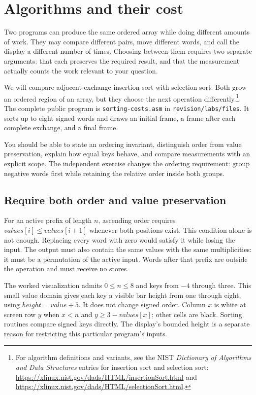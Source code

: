 \chapter{Algorithms and their cost}
\label{revision:algorithms-and-cost}

Two programs can produce the same ordered array while doing different amounts
of work. They may compare different pairs, move different words, and call the
display a different number of times. Choosing between them requires two separate
arguments: that each preserves the required result, and that the measurement
actually counts the work relevant to your question.

We will compare adjacent-exchange insertion sort with selection sort. Both grow
an ordered region of an array, but they choose the next operation differently.\footnote{For
  algorithm definitions and variants, see the NIST \emph{Dictionary of Algorithms and
    Data Structures} entries for insertion sort and selection sort:
  \url{https://xlinux.nist.gov/dads/HTML/insertionSort.html} and
  \url{https://xlinux.nist.gov/dads/HTML/selectionSort.html}.}
The complete public program is \texttt{sorting-costs.asm} in
\texttt{revision/labs/files}. It sorts up to eight signed words and draws an
initial frame, a frame after each complete exchange, and a final frame.

You should be able to state an ordering invariant, distinguish order from value
preservation, explain how equal keys behave, and compare measurements with an
explicit scope. The independent exercise changes the ordering requirement: group
negative words first while retaining the relative order inside both groups.

\section{Require both order and value preservation}

For an active prefix of length $n$, ascending order requires
$values[i]\leq values[i+1]$ whenever both positions exist. This condition alone is
not enough. Replacing every word with zero would satisfy it while losing the input.
The output must also contain the same values with the same multiplicities: it
must be a permutation of the active input. Words after that prefix are outside
the operation and must receive no stores.

The worked visualization admits $0\leq n\leq8$ and keys from $-4$ through three.
This small value domain gives each key a visible bar height from one through eight,
using $height=value+5$. It does not change signed order. Column $x$ is white at
screen row $y$ when $x<n$ and $y\geq3-values[x]$; other cells are black. Sorting
routines compare signed keys directly. The display's bounded height is a separate
reason for restricting this particular program's inputs.

